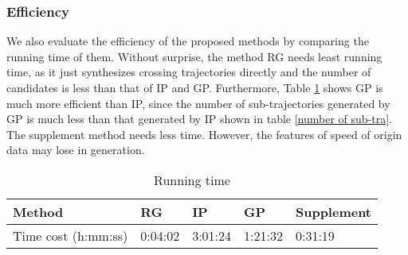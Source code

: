 

\subsubsection{Efficiency} We also evaluate the efficiency of the proposed methods 
by comparing the running time of them. Without surprise, the method RG needs least 
running time, as it just synthesizes crossing trajectories directly and the number 
of candidates is less than that of IP and GP. Furthermore, Table \ref{running time} 
shows GP is much more efficient than IP, since the number of sub-trajectories generated by GP is much less than that generated by IP shown in table \ref{number of sub-tra}. The supplement method needs less time. However, the features of speed of origin data may lose in generation.
\begin{table}[H]
	\centering
	\caption{Running time}
	\label{running time}
	\begin{small}
		\begin{tabular}{p{3cm}|p{1.5cm}|p{1.5cm}|p{1.5cm}|p{1.7cm}}
			\hline
			Method & RG & IP & GP &Supplement \\ \hline
			Time cost (h:mm:ss) & 0:04:02 & 3:01:24 & 1:21:32 & 0:31:19 \\\hline
		\end{tabular}
	\end{small}
\end{table}
